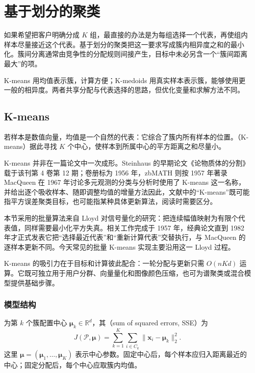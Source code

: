 \section{基于划分的聚类}
\label{sec:clustering-partition}

如果希望把客户明确分成 $K$ 组，最直接的办法是为每组选择一个代表，再使组内样本尽量接近这个代表。基于划分的聚类把这一要求写成簇内相异度之和的最小化。簇间分离通常由竞争性的分配规则间接产生，目标中未必另含一个“簇间距离最大”的项。

K-means 用均值表示簇，计算方便；K-medoids 用真实样本表示簇，能够使用更一般的相异度。两者共享分配与代表选择的思路，但优化变量和求解方法不同。

\subsection{K-means}
\label{sec:clustering-kmeans}

若样本是数值向量，均值是一个自然的代表：它综合了簇内所有样本的位置。（K-means）据此寻找 $K$ 个中心，使样本到所属中心的平方距离之和尽量小。

K-means 并非在一篇论文中一次成形。Steinhaus 的早期论文《论物质体的分割》载于该刊第 4 卷第 12 期；卷册标为 1956 年，zbMATH 则按 1957 年著录MacQueen 在 1967 年讨论多元观测的分类与分析时使用了 K-means 这一名称，并给出逐个吸收样本、随即调整均值的增量方法因此，文献中的“K-means”既可能指平方误差聚类目标，也可能指某种具体更新算法，阅读时需要区分。

本节采用的批量算法来自 Lloyd 对信号量化的研究：把连续幅值映射为有限个代表值，同样需要最小化平方失真。相关工作完成于 1957 年，经典论文直到 1982 年才正式发表它把“选择最近代表”和“重新计算代表”交替执行，与 MacQueen 的逐样本更新不同。今天常见的批量 K-means 实现主要沿用这一 Lloyd 过程。

K-means 的吸引力在于目标和计算彼此配合：一轮分配与更新只需 $O(nKd)$ 运算。它既可独立用于用户分群、向量量化和图像颜色压缩，也可为谱聚类或混合模型提供基础步骤。

\subsubsection{模型结构}

为第 $k$ 个簇配置中心 $\bm{\mu}_k\in\mathbb{R}^d$，其（sum of squared errors, SSE）为
\begin{equation}
  J(\mathcal{P},\bm{\mu})
  =\sum_{k=1}^K\sum_{i\in C_k}
    \lVert\bm{x}_i-\bm{\mu}_k\rVert_2^2.
  \label{eq:clustering-sse}
\end{equation}
这里 $\bm{\mu}=(\bm{\mu}_1,\ldots,\bm{\mu}_K)$ 表示中心参数。固定中心后，每个样本应归入距离最近的中心；固定分配后，每个中心应取簇内均值。

